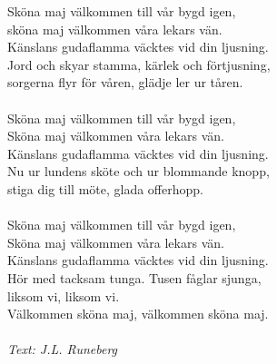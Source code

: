 \vspace{10pt}
Sköna maj välkommen till vår bygd igen,\\
sköna maj välkommen våra lekars vän.\\
Känslans gudaflamma väcktes vid din ljusning.\\
Jord och skyar stamma, kärlek och förtjusning,\\
sorgerna flyr för våren, glädje ler ur tåren.\\
\\
Sköna maj välkommen till vår bygd igen,\\
Sköna maj välkommen våra lekars vän.\\
Känslans gudaflamma väcktes vid din ljusning.\\
Nu ur lundens sköte och ur blommande knopp,\\
stiga dig till möte, glada offerhopp.\\
\\
Sköna maj välkommen till vår bygd igen,\\
Sköna maj välkommen våra lekars vän.\\
Känslans gudaflamma väcktes vid din ljusning.\\
Hör med tacksam tunga. Tusen fåglar sjunga,\\
liksom vi, liksom vi.\\
Välkommen sköna maj, välkommen sköna maj.\\
\\
{\footnotesize\textit{Text: J.L. Runeberg}}
